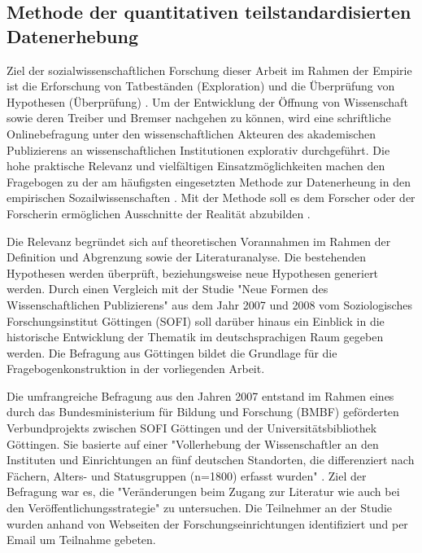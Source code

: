 \subsection{Methode der quantitativen teilstandardisierten Datenerhebung}

Ziel der sozialwissenschaftlichen Forschung dieser Arbeit im Rahmen der Empirie ist die Erforschung von Tatbeständen (Exploration) und die Überprüfung von Hypothesen (Überprüfung) \cite{raab_2012_fragebogen}. Um der Entwicklung der Öffnung von Wissenschaft sowie deren Treiber und Bremser nachgehen zu können, wird eine schriftliche Onlinebefragung unter den wissenschaftlichen Akteuren des akademischen Publizierens an wissenschaftlichen Institutionen explorativ durchgeführt. Die hohe praktische Relevanz und vielfältigen Einsatzmöglichkeiten machen den Fragebogen zu der am häufigsten eingesetzten Methode zur Datenerheung in den empirischen Sozailwissenschaften \cite{raab_2012_fragebogen}. Mit der Methode soll es dem Forscher oder der Forscherin ermöglichen Ausschnitte der Realität abzubilden \cite{raab_2012_fragebogen}.

Die Relevanz begründet sich auf theoretischen Vorannahmen im Rahmen der Definition und Abgrenzung sowie der Literaturanalyse. Die bestehenden Hypothesen werden überprüft, beziehungsweise neue Hypothesen generiert werden. Durch einen Vergleich mit der Studie "Neue Formen des Wissenschaftlichen Publizierens" aus dem Jahr 2007 und 2008 vom Soziologisches Forschungsinstitut Göttingen (SOFI) soll darüber hinaus ein Einblick in die historische Entwicklung der Thematik im deutschsprachigen Raum gegeben werden. Die Befragung aus Göttingen bildet die Grundlage für die Fragebogenkonstruktion in der vorliegenden Arbeit. 

Die umfrangreiche Befragung aus den Jahren 2007 entstand im Rahmen eines durch das Bundesministerium für Bildung und Forschung (BMBF) geförderten Verbundprojekts zwischen SOFI Göttingen und der Universitätsbibliothek Göttingen. Sie basierte auf einer "Vollerhebung der Wissenschaftler an den Instituten und Einrichtungen an fünf deutschen Standorten, die differenziert nach Fächern, Alters- und Statusgruppen (n=1800) erfasst wurden" \cite{Hanekop_2014}. Ziel der Befragung war es, die "Veränderungen beim Zugang zur Literatur wie auch bei den Veröffentlichungsstrategie" \cite{Hanekop_Wittke_2007_Fragebogen} zu untersuchen. Die Teilnehmer an der Studie wurden anhand von Webseiten der Forschungseinrichtungen identifiziert und per Email um Teilnahme gebeten. 

